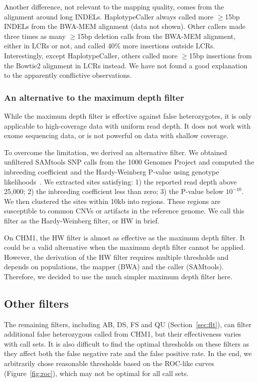 \documentclass{bioinfo}
\begin{document}
Another difference, not relevant to the mapping quality, comes from the alignment
around long INDELs. HaplotypeCaller always called more $\ge$15bp INDELs from
the BWA-MEM alignment (data not shown). Other callers made three times as many $\ge$15bp
deletion calls from the BWA-MEM alignment, either in LCRs or not, and called
40\% more insertions outside LCRs. Interestingly, except HaplotypeCaller,
others called more $\ge$15bp insertions from the Bowtie2 alignment in LCRs
instead. We have not found a good explanation to the apparently conflictive
observations.

\subsubsection{An alternative to the maximum depth filter}
While the maximum depth filter is effective against false heterozygotes, it is
only applicable to high-coverage data with uniform read depth. It
does not work with exome sequencing data, or is not powerful on data with
shallow coverage.

To overcome the limitation, we derived an alternative filter. We obtained
unfiltered SAMtools SNP calls from the 1000 Genomes Project and computed the
inbreeding coefficient and the Hardy-Weinberg P-value using genotype
likelihoods~\citep{Li:2011ab}. We extracted sites satisfying: 1) the reported
read depth above 25,000; 2) the inbreeding coefficient less than zero; 3) the
P-value below $10^{-10}$. We then clustered the sites within 10kb into regions.
These regions are susceptible to common CNVs or artifacts in the reference
genome. We call this filter as the Hardy-Weinberg filter, or HW in brief.

On CHM1, the HW filter is almost as effective as the maximum depth filter.
It could be a valid alternative when the maximum depth filter cannot be
applied.  However, the derivation of the HW filter requires multiple
thresholds and depends on populations, the mapper (BWA) and the caller
(SAMtools). Therefore, we decided to use the much simpler maximum depth filter
here.

\subsection{Other filters}
The remaining filters, including AB, DS, FS and QU (Section~\ref{sec:flt}), can
filter additional false heterozygous called from CHM1, but their effectiveness
varies with call sets. It is also difficult to find the optimal thresholds on
these filters as they affect both the false negative rate and the false
positive rate. In the end, we arbitrarily chose reasonable thresholds based on
the ROC-like curves (Figure~\ref{fig:roc}), which may not be optimal for all
call sets.
\end{document}
